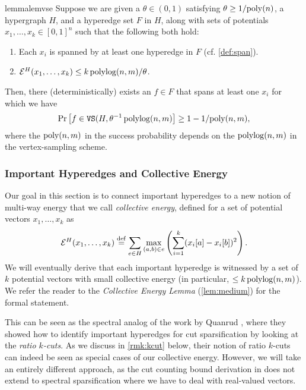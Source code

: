 \documentclass{article}
\begin{document}
\begin{restatable}{lemma}{lemvse}
\label{lem:vse}
Suppose we are given
a $\theta\in(0,1)$ satisfying $\theta \geq 1/\mathrm{poly}(n)$,
    a hypergraph
    $H$, 
    and a hyperedge set $F$ in $H$, along with sets of potentials $x_1,\ldots,x_k\in[0,1]^{n}$ such that
the following both hold:
   \begin{enumerate}
        \item Each $x_i$ is spanned by at least one hyperedge in $F$
        (cf. \cref{def:span}).
        \item $\mathcal{E}^H(x_1,\ldots,x_k) \leq k \operatorname{polylog}(n,m) / \theta$.
    \end{enumerate}
    Then, there (deterministically) exists an $f\in F$ that spans
    at least one $x_i$ for which we have
    \begin{align*}
        \mathrm{Pr}\left[ f\in \mathtt{VS}(H,\theta^{-1}\operatorname{polylog}(n,m) \right]
        \geq 1 - 1/\mathrm{poly}(n,m),
    \end{align*}
     where the $\mathrm{poly}(n,m)$ in the success probability depends
        on the $\operatorname{polylog}(n,m)$ in the vertex-sampling scheme.
\end{restatable}

\subsubsection{Important Hyperedges and Collective Energy}\label{sec:collectiveenergyintro}

Our goal in this section is to connect important hyperedges
to a new notion of multi-way energy that we call
\textit{collective energy}, defined for
a set of potential vectors $x_1,\ldots,x_k$ as
\begin{align}\label{eq:collectiveenergyearly}
    \mathcal{E}^H(x_1,\ldots,x_k) \stackrel{\mathrm{def}}{=}
    \sum_{e\in H}
    \max_{(a,b)\in e}
    \left(
    \sum_{i=1}^{k} (x_i[a]-x_i[b])^2
    \right).
\end{align}
We will eventually derive that
each important hyperedge is witnessed by a set of $k$ potential
vectors with small collective energy (in particular, $\leq k\operatorname{polylog}(n,m)$).
We refer the reader to the \textit{Collective Energy Lemma} (\cref{lem:medium})
for the formal statement.

This can be seen as the spectral analog of the work by Quanrud \cite{Qua23},
where they showed how to identify important hyperedges for cut sparsification
by looking at the \textit{ratio $k$-cuts}.
As we discuss in \cref{rmk:kcut} below,
their notion of ratio $k$-cuts can indeed be seen
as special cases of our collective energy.
However, we will take an entirely different approach,
as the cut counting bound derivation in \cite{Qua23} does not extend to spectral sparsification where we have to deal with real-valued vectors.
\end{document}
